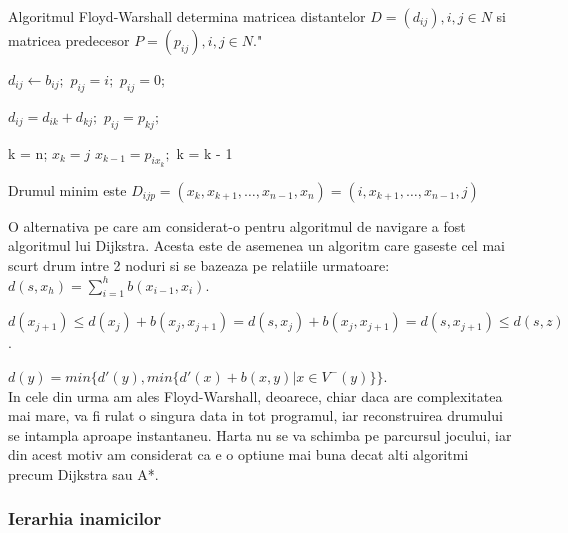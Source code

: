 \documentclass[12pt, a4paper]{article}
\begin{document}
	Algoritmul Floyd-Warshall determina matricea distantelor $D = (d_{ij}), i, j \in N$ si matricea predecesor $P = (p_{ij}), i, j \in N$." \cite{grafuriAnul2}
	
	\begin{algorithmic}
					\State $d_{ij} \gets b_{ij};$
						\State $p_{ij} = i;$
					\Else
						\State $p_{ij} = 0;$
					\EndIf
				\EndFor
			\EndFor
			
							\State $d_{ij} = d_{ik} + d_{kj};$
							\State $p_{ij} = p_{kj};$
						\EndIf
					\EndFor
				\EndFor
			\EndFor
		\EndFunction
	\end{algorithmic}

	\begin{algorithmic}
		\Function{Reconstruire Drum}{}
			\State k = n;
			\State $x_k = j$
			\While{$x_k \neq i$}
				\State $x_{k - 1} = p_{ix_k};$
				\State k = k - 1
			\EndWhile
		\EndFunction
	\end{algorithmic}

	Drumul minim este $D_{ijp} = (x_k, x_{k+1}, \dots, x_{n-1}, x_n) = (i, x_{k+1}, \dots, x_{n-1}, j)$
	
	O alternativa pe care am considerat-o pentru algoritmul de navigare a fost algoritmul lui Dijkstra. Acesta este de asemenea un algoritm care gaseste cel mai scurt drum intre 2 noduri si se bazeaza pe relatiile urmatoare:
	\\
	
	$d(s, x_h) = \sum_{i=1}^{h} b(x_{i-1}, x_i)$.
	
	$d(x_{j+1}) \leq d(x_j) + b(x_j, x_{j+1}) = d(s, x_j) + b(x_j, x_{j+1}) = d(s, x_{j+1}) \leq d(s, z)$.
	
	$d(y) = min\{d'(y), min\{d'(x) + b(x, y) | x \in V^-(y)\}\}$.
	\\
	
	In cele din urma am ales Floyd-Warshall, deoarece, chiar daca are complexitatea mai mare, va fi rulat o singura data in tot programul, iar reconstruirea drumului se intampla aproape instantaneu. Harta nu se va schimba pe parcursul jocului, iar din acest motiv am considerat ca e o optiune mai buna decat alti algoritmi precum Dijkstra sau A*.
	
	\subsubsection{Ierarhia inamicilor}
	
\end{document}
